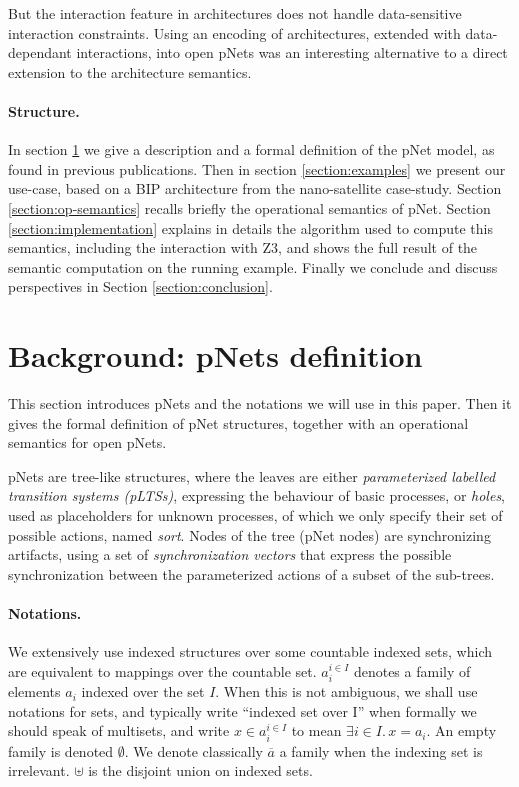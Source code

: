 \documentclass[smallcondensed]{svjour3}
\begin{document}
But the interaction feature in architectures does not handle
data-sensitive interaction constraints. Using an encoding of
architectures, extended with data-dependant interactions, into open
pNets was an interesting alternative to a direct extension to the
architecture semantics.
 
\paragraph{Structure.}
In section
\ref{section:pnets} we give a description and a formal definition of
the pNet model, as found in previous publications. Then in section
\ref{section:examples} we present our use-case, based on a BIP
architecture from the nano-satellite case-study. 
Section \ref{section:op-semantics} recalls briefly the operational semantics
of pNet.
Section \ref{section:implementation} explains in details the algorithm
used to compute this semantics, including the interaction with Z3, and
shows the full result of the semantic computation on the running example.
Finally we conclude and discuss perspectives in Section
\ref{section:conclusion}. 




\section{Background: pNets definition}
\label{section:pnets}

This section introduces pNets and the notations we will use in
this paper. Then it gives the formal definition of pNet structures,
together with an operational semantics for open pNets.

pNets are tree-like structures, where the leaves are either
\emph{parameterized labelled transition systems (pLTSs)}, expressing the
behaviour of basic processes, or \emph{holes}, used as placeholders
for unknown processes, of which we only specify their set of possible
actions, named \emph{sort}.
Nodes of the tree (pNet nodes) are synchronizing artifacts, using a
set of \emph{synchronization vectors} that express the possible
synchronization between the parameterized actions of a subset of the
sub-trees.


\paragraph*{Notations.}
We extensively use indexed structures
over some countable indexed sets, which are equivalent to mappings over
the countable set. %
$a_i^{i\in I}$
denotes a family of elements $a_i$ indexed over the
set $I$.
When this is not
ambiguous, we shall use notations for sets, and typically write
``indexed set over I'' when formally we should speak of multisets, and
write $x\in a_i^{i\in I}$ to mean $\exists i\in I.\, x=a_i$.  An empty
family is denoted $\emptyset$. We
denote classically $\overline{a}$ a family when the indexing set is
irrelevant.  $\uplus$ is the disjoint union on indexed sets.
\end{document}
